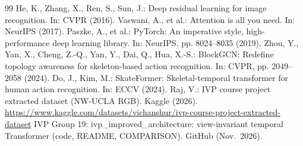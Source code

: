 \documentclass[runningheads]{llncs}
\begin{document}
\begin{thebibliography}{99}
 He, K., Zhang, X., Ren, S., Sun, J.: Deep residual learning for image recognition. In: CVPR (2016).
 Vaswani, A., et al.: Attention is all you need. In: NeurIPS (2017).
 Paszke, A., et al.: PyTorch: An imperative style, high-performance deep learning library. In: NeurIPS, pp. 8024--8035 (2019).
 Zhou, Y., Yan, X., Cheng, Z.-Q., Yan, Y., Dai, Q., Hua, X.-S.: BlockGCN: Redefine topology awareness for skeleton-based action recognition. In: CVPR, pp. 2049--2058 (2024).
 Do, J., Kim, M.: SkateFormer: Skeletal-temporal transformer for human action recognition. In: ECCV (2024).
 Raj, V.: IVP course project extracted dataset (NW-UCLA RGB). Kaggle (2026). \url{https://www.kaggle.com/datasets/vichanshur/ivp-course-project-extracted-dataset}
 IVP Group 19: ivp\_improved\_architecture: view-invariant temporal Transformer (code, README, COMPARISON). GitHub (Nov.\ 2026).
\end{thebibliography}
\end{document}

